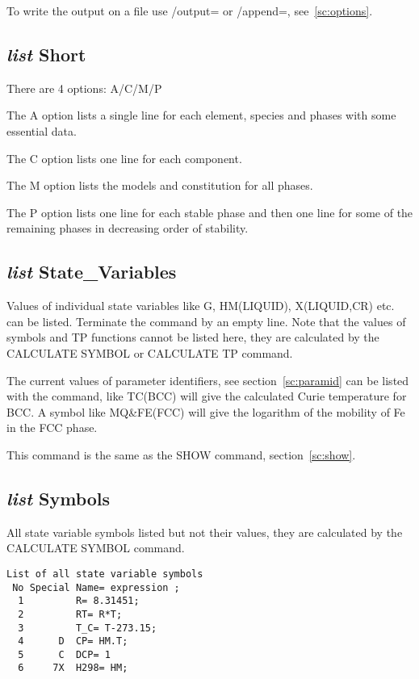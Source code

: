 \documentclass[11pt]{article}
\begin{document}
To write the output on a file use /output= or /append=,
see~\ref{sc:options}.

\hypertarget{List short}{}
\subsection{{\em list} Short}

There are 4 options: A/C/M/P

The A option lists a single line for each element, species and phases
with some essential data.

The C option lists one line for each component.

The M option lists the models and constitution for all phases.

The P option lists one line for each stable phase and then one line
for some of the remaining phases in decreasing order of stability.

\hypertarget{List state variables}{}
\subsection{{\em list} State\_Variables}\label{sc:list_statevar}

Values of individual state variables like G, HM(LIQUID), X(LIQUID,CR)
etc. can be listed.  Terminate the command by an empty line.  Note
that the values of symbols and TP functions cannot be listed here,
they are calculated by the CALCULATE SYMBOL or CALCULATE TP command.

The current values of parameter identifiers, see
section~\ref{sc:paramid} can be listed with the command, like TC(BCC)
will give the calculated Curie temperature for BCC.  A symbol like
MQ\&FE(FCC) will give the logarithm of the mobility of Fe in the FCC
phase.

This command is the same as the SHOW command, section~\ref{sc:show}.

\hypertarget{List symbols}{}
\subsection{{\em list} Symbols}

All state variable symbols listed but not their values, they are
calculated by the CALCULATE SYMBOL command.

\begin{verbatim}
List of all state variable symbols
 No Special Name= expression ;
  1         R= 8.31451;
  2         RT= R*T;
  3         T_C= T-273.15;
  4      D  CP= HM.T;
  5      C  DCP= 1
  6     7X  H298= HM;
\end{verbatim}
\end{document}
